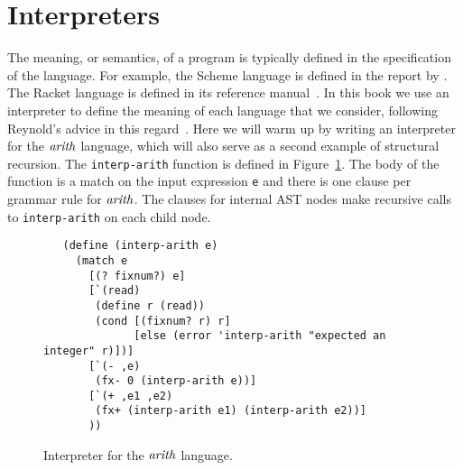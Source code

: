 \documentclass[12pt]{book}
\begin{document}


\section{Interpreters}
\label{sec:interp-arith}

The meaning, or semantics, of a program is typically defined in the
specification of the language. For example, the Scheme language is
defined in the report by \cite{SPERBER:2009aa}. The Racket language is
defined in its reference manual~\citep{plt-tr}. In this book we use an
interpreter to define the meaning of each language that we consider,
following Reynold's advice in this
regard~\citep{reynolds72:_def_interp}. Here we will warm up by writing
an interpreter for the $\mathit{arith}$ language, which will also serve
as a second example of structural recursion. The \texttt{interp-arith}
function is defined in Figure~\ref{fig:interp-arith}. The body of the
function is a match on the input expression \texttt{e} and there is
one clause per grammar rule for $\mathit{arith}$. The clauses for
internal AST nodes make recursive calls to \texttt{interp-arith} on
each child node.

\begin{figure}[tbp]
\begin{lstlisting}
   (define (interp-arith e)
     (match e
       [(? fixnum?) e]
       [`(read)
        (define r (read))
        (cond [(fixnum? r) r]
              [else (error 'interp-arith "expected an integer" r)])]
       [`(- ,e)
        (fx- 0 (interp-arith e))]
       [`(+ ,e1 ,e2)
        (fx+ (interp-arith e1) (interp-arith e2))]
       ))
\end{lstlisting}
\caption{Interpreter for the $\mathit{arith}$ language.}
\label{fig:interp-arith}
\end{figure}
\end{document}
